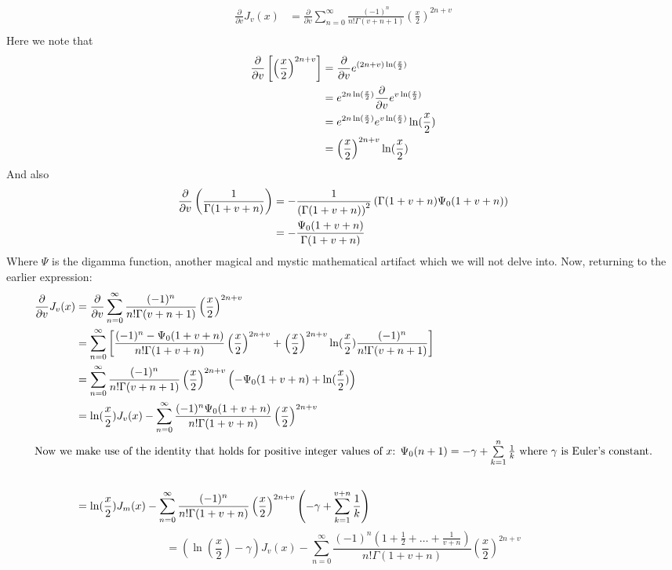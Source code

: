 \documentclass[]{article}
\begin{document}
\begin{align*}
	\frac{\partial}{\partial v} J_v(x) &= \frac{\partial}{\partial v} \sum_{n = 0}^{\infty} \frac{(-1)^n}{n!\Gamma(v+n+1)}
		 \left(\frac{x}{2}\right)^{2n+v}\\
\end{align*}
Here we note that
\begin{align*}
 	\frac{\partial}{\partial {v}}\left[\left(\frac{x}{2}\right)^{2n+v}\right] &= \frac{\partial}{\partial {v}} e^{(2n+v)\ln(\frac{x}{2})}\\
 	&= e^{2n\ln(\frac{x}{2})} \frac{\partial}{\partial {v}} e^{v\ln(\frac{x}{2})} \\
 	&= e^{2n\ln(\frac{x}{2})}  e^{v\ln(\frac{x}{2})} \ln(\frac{x}{2}) \\
 	&= \left(\frac{x}{2}\right)^{2n+v}\ln(\frac{x}{2})
\end{align*}
And also
\begin{align*}
	\frac{\partial}{\partial {v}}\left( \frac{1}{\Gamma(1+v+n)}\right) &= - \frac{1}{\left(\Gamma(1+v+n)\right)^2} \left(\Gamma(1+v+n)\Psi _0(1+v+n)\right)\\
	&= -\frac{\Psi _0(1+v+n)}{\Gamma(1+v+n)}
\end{align*}
Where $\Psi$ is the digamma function, another magical and mystic mathematical artifact which we will not delve into.
Now, returning to the earlier expression:
\begin{align*}
	\frac{\partial}{\partial v} J_v(x) &= \frac{\partial}{\partial v} \sum_{n = 0}^{\infty} \frac{(-1)^n}{n!\Gamma(v+n+1)}
		\left(\frac{x}{2}\right)^{2n+v}\\
		 &= \sum_{n=0}^{\infty}\left[ \frac{(-1)^n -\Psi _0(1+v+n)}{n!\Gamma(1+v+n)} \left(\frac{x}{2}\right)^{2n+v}
		 +\left(\frac{x}{2}\right)^{2n+v}\ln(\frac{x}{2})
		  \frac{(-1)^n}{n!\Gamma(v+n+1)}
		 \right] \\
		 &= \sum_{n=0}^{\infty}  \frac{(-1)^n}{n!\Gamma(v+n+1)}	\left(\frac{x}{2}\right)^{2n+v} \left(
		 -\Psi _0(1+v+n) + \ln(\frac{x}{2})
		 \right) \\
		 &= \ln(\frac{x}{2}) J_v(x) - \sum_{n=0}^{\infty} \frac{(-1)^n \Psi _0(1+v+n)}{n!\Gamma(1+v+n)}	\left(\frac{x}{2}\right)^{2n+v}\\
		 \intertext{Now we make use of the identity that holds for positive integer values of $x$: $\Psi_0(n+1) = - \gamma + \sum\limits_{k = 1}^{n} \frac{1}{k}$ where $\gamma$ is Euler's constant.}\\
		 &=  \ln(\frac{x}{2}) J_m(x) - \sum_{n=0}^{\infty} \frac{(-1)^n }{n!\Gamma(1+v+n)}	\left(\frac{x}{2}\right)^{2n+v}
		 \left(- \gamma + \sum_{k = 1}^{v+n} \frac{1}{k}
		 \right)
\end{align*}	
\begin{equation} \label{eq:pderiv1}
\boxed{
		 =  \left( \ln(\frac{x}{2}) - \gamma \right) J_v(x) - \sum_{n=0}^{\infty} \frac{(-1)^n(1 + \frac{1}{2} + \ldots + \frac{1}{v+n}) }{n!\Gamma(1+v+n)} 	\left(\frac{x}{2}\right)^{2n+v}
		 }
\end{equation}		
\end{document}
